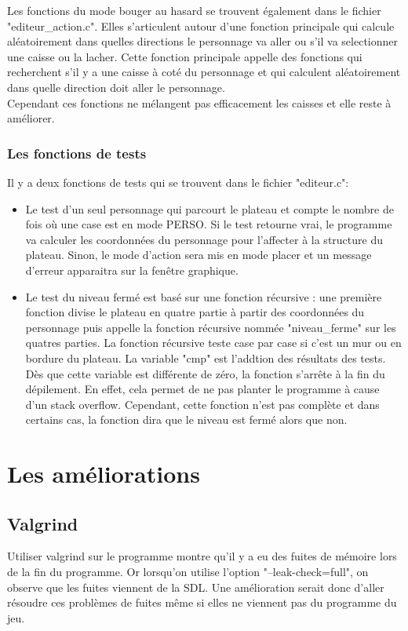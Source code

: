 \documentclass{report}
\begin{document}
Les fonctions du mode bouger au hasard se trouvent également dans le fichier "editeur\_action.c". Elles s'articulent autour d'une fonction principale qui calcule aléatoirement dans quelles directions le personnage va aller ou s'il va selectionner une caisse ou la lacher.
Cette fonction principale appelle des fonctions qui recherchent s'il y a une caisse à coté du personnage et qui calculent aléatoirement dans quelle direction doit aller le personnage.\\
Cependant ces fonctions ne mélangent pas efficacement les caisses et elle reste à améliorer.

		\section{Les fonctions de tests}
Il y a deux fonctions de tests qui se trouvent dans le fichier "editeur.c":\\
\begin{itemize}
\item Le test d'un seul personnage qui parcourt le plateau et compte le nombre de fois où une case est en mode PERSO. Si le test retourne vrai, le programme va calculer les coordonnées du personnage pour l'affecter à la structure du plateau. Sinon, le mode d'action sera mis en mode placer et un message d'erreur apparaitra sur la fenêtre graphique.
\item Le test du niveau fermé est basé sur une fonction récursive : une première fonction divise le plateau en quatre partie à partir des coordonnées du personnage puis appelle la fonction récursive nommée "niveau\_ferme" sur les quatres parties.
La fonction récursive teste case par case si c'est un mur ou en bordure du plateau. La variable "cmp" est l'addtion des résultats des tests. Dès que cette variable est différente de zéro, la fonction s'arrête à la fin du dépilement. En effet, cela permet de ne pas planter le programme à cause d'un stack overflow.
Cependant, cette fonction n'est pas complète et dans certains cas, la fonction dira que le niveau est fermé alors que non.
\end{itemize}

\part{Les améliorations}
	\chapter{Valgrind}
Utiliser valgrind sur le programme montre qu'il y a eu des fuites de mémoire lors de la fin du programme. Or lorsqu'on utilise l'option "--leak-check=full", on observe que les fuites viennent de la SDL. 
Une amélioration serait donc d'aller résoudre ces problèmes de fuites même si elles ne viennent pas du programme du jeu. 
\end{document}
